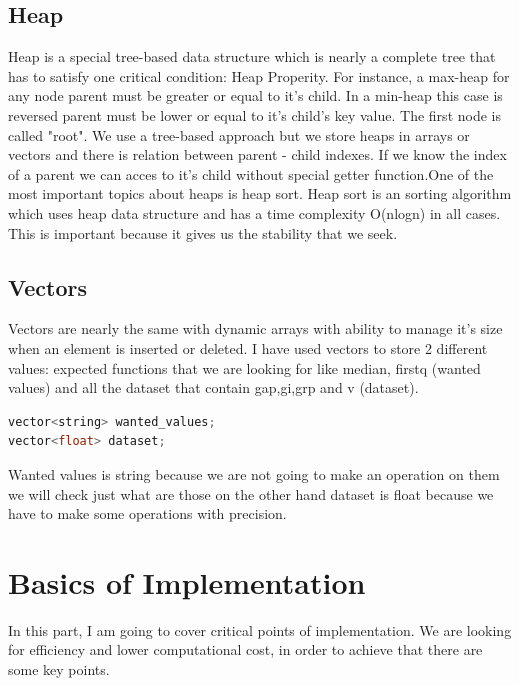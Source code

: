 \documentclass[a4paper, 12pt, titlepage]{article}
\begin{document}
\subsection{Heap}
    Heap is a special tree-based data structure which is nearly a complete tree that has to satisfy one critical condition: Heap Properity. For instance, a max-heap for any node parent must be greater or equal to it's child. In a min-heap this case is reversed parent must be lower or equal to it's child's key value. The first node is called "root". We use a tree-based approach but we store heaps in arrays or vectors and there is relation between parent - child indexes. If we know the index of a parent we can acces to it's child without special getter function.One of the most important topics about heaps is heap sort. Heap sort is an sorting algorithm which uses heap data structure and has a time complexity O(nlogn) in all cases. This is important because it gives us the stability that we seek. 

        

\subsection{Vectors}
    Vectors are nearly the same with dynamic arrays with ability to manage it's size when an element is inserted or deleted. I have used vectors to store 2 different values: expected functions that we are looking for like median, firstq  (wanted values) and all the dataset that contain gap,gi,grp and v (dataset).

\usepackage{\textbf{Vectors used}} 
\begin{lstlisting}[language=C++]
vector<string> wanted_values;      
vector<float> dataset;            
\end{lstlisting}

Wanted values is string because we are not going to make an operation on them we will check just what are those on the other hand dataset is float because we have to make some operations with precision.

\section{Basics of Implementation}
    
    In this part, I am going to cover critical points of implementation. We are looking for efficiency and lower computational cost, in order to achieve that there are some key points.
    
\end{document}
